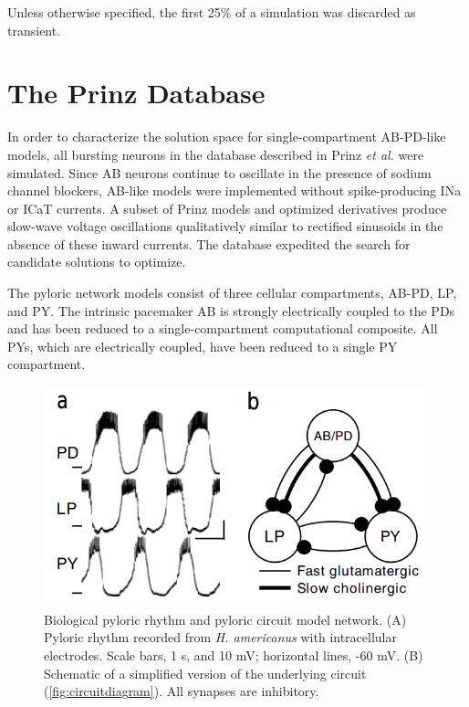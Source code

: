 Unless otherwise specified, the first 25\% of a simulation was discarded as transient.

\FloatBarrier

\section{The Prinz Database} \label{sec:prinzdatabase}
In order to characterize the solution space for single-compartment \acs{AB}-\acs{PD}-like models, all bursting neurons in the database described in Prinz \textit{et al.} were simulated. Since \acs{AB} neurons continue to oscillate in the presence of sodium channel blockers, \acs{AB}-like models were implemented without spike-producing \acs{INa} or \acs{ICaT} currents. A subset of Prinz models and optimized derivatives produce slow-wave voltage oscillations qualitatively similar to rectified sinusoids in the absence of these inward currents. The database expedited the search for candidate solutions to optimize.

The pyloric network models consist of three cellular compartments, \acs{AB}-\acs{PD}, \acs{LP}, and \acs{PY}. The intrinsic pacemaker \acs{AB} is strongly electrically coupled to the \acp{PD} and has been reduced to a single-compartment computational composite. All \acp{PY}, which are electrically coupled, have been reduced to a single \acs{PY} compartment.

\begin{figure}[h]
	\centering
	\includegraphics[width=1.0\linewidth]{gfx/prinz1}
	\caption[Pyloric network model architecture]{Biological pyloric rhythm and pyloric circuit model network. (\textsc{A}) Pyloric rhythm recorded from \textit{H. americanus} with intracellular electrodes. Scale bars, 1 s, and 10 mV; horizontal lines, -60 mV. (\textsc{B}) Schematic of a simplified version of the underlying circuit (\autoref{fig:circuitdiagram}). All synapses are inhibitory\autocite{PrinzSimilarnetworkactivity2004}.}
	\label{fig:prinz1}
\end{figure}

